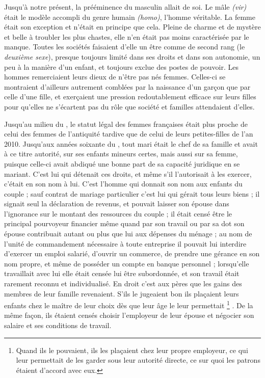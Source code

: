  Jusqu'à notre présent, la prééminence du masculin allait de soi. Le mâle \emph{(vir)} était le modèle accompli du genre humain \emph{(homo)}, l'homme véritable. La femme était son exception et n'était en principe que cela. Pleine de charme et de mystère et belle à troubler les plus chastes, elle n'en était pas moins caractérisée par le manque. Toutes les sociétés faisaient d'elle un être comme de second rang (le {\emph{deuxième sexe}}), presque toujours limité dans ses droits et dans son autonomie, un peu à la manière d'un enfant, et toujours exclue des postes de pouvoir. Les hommes remerciaient leurs dieux de n'être pas nés femmes. Celles-ci se montraient d'ailleurs autrement comblées par la naissance d'un garçon que par celle d'une fille, et exerçaient une pression redoutablement efficace sur leurs filles pour qu'elles ne s'écartent pas du rôle que société et familles attendaient d'elles.

 Jusqu'au milieu du , le statut légal des femmes françaises était plus proche de celui des femmes de l'antiquité tardive que de celui de leurs petites-filles de l'an 2010. Jusqu'aux années soixante du , tout mari était le chef de sa famille et avait à ce titre autorité, sur ses enfants mineurs certes, mais aussi sur sa femme, puisque celle-ci avait abdiqué une bonne part de sa capacité juridique en se mariant. C'est lui qui détenait ces droits, et même s'il l'autorisait à les exercer, c'était en son nom à lui. C'est l'homme qui donnait son nom aux enfants du couple ; sauf contrat de mariage particulier c'est lui qui gérait tous leurs biens ; il signait seul la déclaration de revenus, et pouvait laisser son épouse dans l'ignorance sur le montant des ressources du couple ; il était censé être le principal pourvoyeur financier même quand par son travail ou par sa dot son épouse contribuait autant ou plus que lui aux dépenses du ménage ; au nom de l'unité de commandement nécessaire à toute entreprise il pouvait lui interdire d'exercer un emploi salarié, d'ouvrir un commerce, de prendre une gérance en son nom propre, et même de posséder un compte en banque personnel ; lorsqu'elle travaillait avec lui elle était censée lui être subordonnée, et son travail était rarement reconnu et individualisé. En droit c'est aux pères que les gains des membres de leur famille revenaient. S'ils le jugeaient bon ils plaçaient leurs enfants chez le maître de leur choix dès que leur âge le leur permettait%
\footnote{Quand ils le pouvaient, ils les plaçaient chez leur propre employeur, ce qui leur permettait de les garder sous leur autorité directe, ce sur quoi les patrons étaient d'accord avec eux.}%
. De la même façon, ils étaient censés choisir l'employeur de leur épouse et négocier son salaire et ses conditions de travail. 

